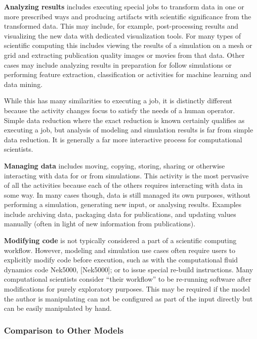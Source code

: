 \textbf{Analyzing results} includes executing special jobs to transform
data in one or more prescribed ways and producing artifacts with
scientific significance from the transformed data. This may include, for
example, post-processing results and visualizing the new data with
dedicated visualization tools. For many types of scientific computing
this includes viewing the results of a simulation on a mesh or grid and
extracting publication quality images or movies from that data. Other
cases may include analyzing results in preparation for follow
simulations or performing feature extraction, classification or
activities for machine learning and data mining.

While this has many similarities to executing a job, it is distinctly
different because the activity changes focus to satisfy the needs of a
human operator. Simple data reduction where the exact reduction is known
certainly qualifies as executing a job, but analysis of modeling and
simulation results is far from simple data reduction. It is generally a
far more interactive process for computational scientists.

\textbf{Managing data} includes moving, copying, storing, sharing or
otherwise interacting with data for or from simulations. This activity
is the most pervasive of all the activities because each of the others
requires interacting with data in some way. In many cases though, data
is still managed its own purposes, without performing a simulation,
generating new input, or analysing results. Examples include archiving
data, packaging data for publications, and updating values manually
(often in light of new information from publications).

\textbf{Modifying code} is not typically considered a part of a
scientific computing workflow. However, modeling and simulation use
cases often require users to explicitly modify code before execution,
such as with the computational fluid dynamics code Nek5000,
{[}Nek5000{]}; or to issue special re-build instructions. Many
computational scientists consider ``their workflow'' to be re-running
software after modifications for purely exploratory purposes. This may
be required if the model the author is manipulating can not be
configured as part of the input directly but can be easily manipulated
by hand.

\subsubsection{Comparison to Other
Models}\label{comparison-to-other-models}

